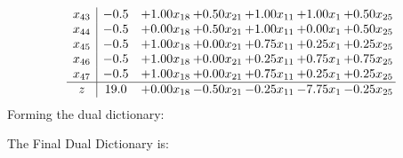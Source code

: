 \documentclass[8pt]{article}
\begin{document}
\[\begin{array}{c| c c@{\hskip 2pt} c@{\hskip 2pt} c@{\hskip 2pt} c@{\hskip 2pt} c@{\hskip 2pt} }
 x_{43}   &  -0.5 & +  1.00 x_{18} & +  0.50 x_{21} & +  1.00 x_{11} & +  1.00 x_{1} & +  0.50 x_{25}\\
 x_{44}   &  -0.5 & +  0.00 x_{18} & +  0.50 x_{21} & +  1.00 x_{11} & +  0.00 x_{1} & +  0.50 x_{25}\\
 x_{45}   &  -0.5 & +  1.00 x_{18} & +  0.00 x_{21} & +  0.75 x_{11} & +  0.25 x_{1} & +  0.25 x_{25}\\
 x_{46}   &  -0.5 & +  1.00 x_{18} & +  0.00 x_{21} & +  0.25 x_{11} & +  0.75 x_{1} & +  0.75 x_{25}\\
 x_{47}   &  -0.5 & +  1.00 x_{18} & +  0.00 x_{21} & +  0.75 x_{11} & +  0.25 x_{1} & +  0.25 x_{25}\\
\hline
z    &  19.0 & +  0.00 x_{18} & -0.50 x_{21} & -0.25 x_{11} & -7.75 x_{1} & -0.25 x_{25}\\
\end{array}\]
Forming the dual dictionary:

The Final Dual Dictionary is: 
\end{document}
